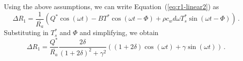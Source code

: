 \documentclass{ametsocV5}
\begin{document}
        Using the above assumptions, we can write Equation~(\ref{eq:r1-linear2}) as
        \begin{equation} \label{eq:r1-linear3}
          \Delta R_{1} = \frac{1}{\overline{R_{a}}}\left(Q^{*}\cos(\omega t) -BT^{*}\cos(\omega t - \Phi)+\rho c_{w} d \omega T_{s}^{*}\sin(\omega t - \Phi) \right) \, .
        \end{equation}
        Substituting in $T_{s}^{*}$ and $\Phi$ and simplifying, we obtain
        \begin{equation} \label{eq:r1-linear4-deriv}
          \Delta R_{1} = \frac{Q^{*}}{\overline{R_{a}}}\frac{2\delta}{(1+2\delta)^{2}+\gamma^{2}}\left((1+2\delta)\cos(\omega t)+\gamma\sin(\omega t)\right) \, .
        \end{equation}





%

%
\end{document}
